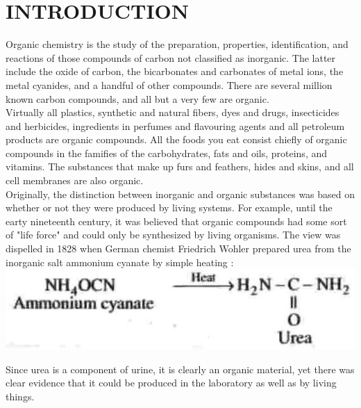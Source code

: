 \documentclass[10pt]{article}
\begin{document}
\section*{INTRODUCTION}
Organic chemistry is the study of the preparation, properties, identification, and reactions of those compounds of carbon not classified as inorganic. The latter include the oxide of carbon, the bicarbonates and carbonates of metal ions, the metal cyanides, and a handful of other compounds. There are several million known carbon compounds, and all but a very few are organic.\\
Virtually all plastics, synthetic and natural fibers, dyes and drugs, insecticides and herbicides, ingredients in perfumes and flavouring agents and all petroleum products are organic compounds. All the foods you eat consist chiefly of organic compounds in the famifies of the carbohydrates, fats and oils, proteins, and vitamins. The substances that make up furs and feathers, hides and skins, and all cell membranes are also organic.\\
Originally, the distinction between inorganic and organic substances was based on whether or not they were produced by living systems. For example, until the earty nineteenth century, it was believed that organic compounds had some sort of "life force" and could only be synthesized by living organisms. The view was dispelled in 1828 when German chemist Friedrich Wohler prepared urea from the inorganic salt ammonium cyanate by simple heating :\\
\includegraphics[max width=\textwidth, center]{2025_01_28_8470952b98110cec3aabg-003}

Since urea is a component of urine, it is clearly an organic material, yet there was clear evidence that it could be produced in the laboratory as well as by living things.
\end{document}
